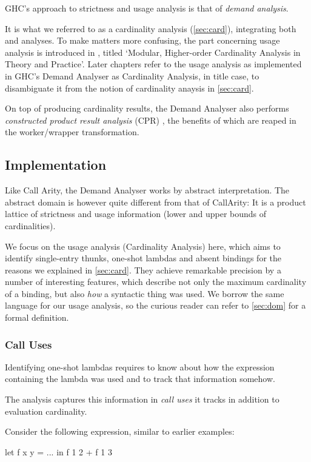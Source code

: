 GHC's approach to strictness and usage analysis is that of \emph{demand analysis}.

It is what we referred to as a cardinality analysis (\cref{sec:card}), integrating both \MinCard and \MaxCard analyses.
To make matters more confusing, the part concerning usage analysis is introduced in \textcite{card}, titled `Modular, Higher-order Cardinality Analysis in Theory and Practice'.
Later chapters refer to the usage analysis as implemented in GHC's Demand Analyser as Cardinality Analysis, in title case, to disambiguate it from the notion of cardinality anaysis in \cref{sec:card}.

On top of producing cardinality results, the Demand Analyser also performs \emph{constructed product result analysis} (CPR) \parencite{cpr}, the benefits of which are reaped in the worker/wrapper transformation. 

\subsection{Implementation}

Like Call Arity, the Demand Analyser works by abstract interpretation.
The abstract domain is however quite different from that of CallArity:
It is a product lattice of strictness and usage information (\eg lower and upper bounds of cardinalities).

We focus on the usage analysis (Cardinality Analysis) here, which aims to identify single-entry thunks, one-shot lambdas and absent bindings \parencite[Section~2]{card} for the reasons we explained in \cref{sec:card}.
They achieve remarkable precision by a number of interesting features, which describe not only the maximum cardinality of a binding, but also \emph{how} a syntactic thing was used.
We borrow the same language for our usage analysis, so the curious reader can refer to \cref{sec:dom} for a formal definition.

\subsubsection{Call Uses}

Identifying one-shot lambdas requires to know about how the expression containing the lambda was used and to track that information somehow.

The analysis captures this information in \emph{call uses} it tracks in addition to evaluation cardinality.

Consider the following expression, similar to earlier examples:
\begin{haskellcode}
  let f x y = ...
  in f 1 2 + f 1 3
\end{haskellcode}

